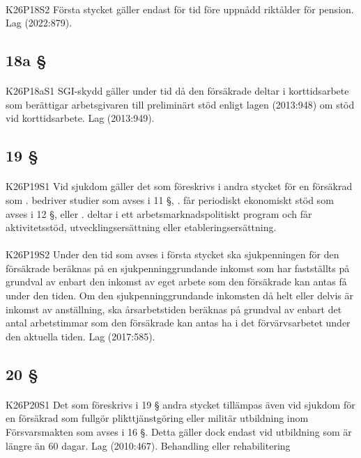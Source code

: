 \documentclass[a4paper,notitlepage,openany,10pt]{book}
\begin{document}
\paragraph*{}
{\tiny K26P18S2}
Första stycket gäller endast för tid före uppnådd riktålder för pension.
Lag (2022:879).
\subsection*{18a §}
\paragraph*{}
{\tiny K26P18aS1}
SGI-skydd gäller under tid då den försäkrade deltar i korttidsarbete som berättigar arbetsgivaren till preliminärt stöd enligt lagen (2013:948) om stöd vid korttidsarbete.
Lag (2013:949).
\subsection*{19 §}
\paragraph*{}
{\tiny K26P19S1}
Vid sjukdom gäller det som föreskrivs i andra stycket för en försäkrad som
. bedriver studier som avses i 11 §,
. får periodiskt ekonomiskt stöd som avses i 12 §, eller
. deltar i ett arbetsmarknadspolitiskt program och får aktivitetsstöd, utvecklingsersättning eller etableringsersättning.
\paragraph*{}
{\tiny K26P19S2}
Under den tid som avses i första stycket ska sjukpenningen för den försäkrade beräknas på en sjukpenninggrundande inkomst som har fastställts på grundval av enbart den inkomst av eget arbete som den försäkrade kan antas få under den tiden. Om den sjukpenninggrundande inkomsten då helt eller delvis är inkomst av anställning, ska årsarbetstiden beräknas på grundval av enbart det antal arbetstimmar som den försäkrade kan antas ha i det förvärvsarbetet under den aktuella tiden.
Lag (2017:585).
\subsection*{20 §}
\paragraph*{}
{\tiny K26P20S1}
Det som föreskrivs i 19 § andra stycket tillämpas även vid sjukdom för en försäkrad som fullgör plikttjänstgöring eller militär utbildning inom Försvarsmakten som avses i 16 §.
Detta gäller dock endast vid utbildning som är längre än 60 dagar.
Lag (2010:467).
Behandling eller rehabilitering
\end{document}
